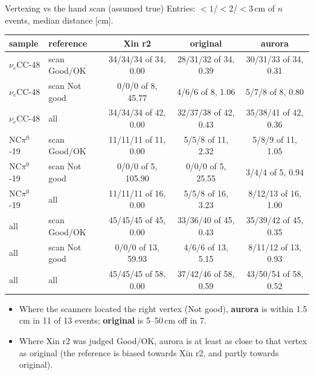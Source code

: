 \documentclass[aspectratio=169,10pt]{beamer}
\begin{document}
\begin{frame}{Vertexing vs the hand scan (assumed true)}
\scriptsize
Entries: $<1$/$<2$/$<3$\,cm of $n$ events, median distance [cm].
\begin{center}
\begin{tabular}{llccc}
\toprule
sample & reference & Xin r2 & original & aurora \\
\midrule
$\nu_e$CC-48 & scan Good/OK & 34/34/34 of 34, 0.00 & 28/31/32 of 34, 0.39 & 30/31/33 of 34, 0.31 \\
$\nu_e$CC-48 & scan Not good & 0/0/0 of 8, 45.77 & 4/6/6 of 8, 1.06 & 5/7/8 of 8, 0.80 \\
$\nu_e$CC-48 & all & 34/34/34 of 42, 0.00 & 32/37/38 of 42, 0.43 & 35/38/41 of 42, 0.36 \\
NC$\pi^0$-19 & scan Good/OK & 11/11/11 of 11, 0.00 & 5/5/8 of 11, 2.32 & 5/8/9 of 11, 1.05 \\
NC$\pi^0$-19 & scan Not good & 0/0/0 of 5, 105.90 & 0/0/0 of 5, 25.55 & 3/4/4 of 5, 0.94 \\
NC$\pi^0$-19 & all & 11/11/11 of 16, 0.00 & 5/5/8 of 16, 3.23 & 8/12/13 of 16, 1.00 \\
all & scan Good/OK & 45/45/45 of 45, 0.00 & 33/36/40 of 45, 0.43 & 35/39/42 of 45, 0.35 \\
all & scan Not good & 0/0/0 of 13, 59.93 & 4/6/6 of 13, 5.15 & 8/11/12 of 13, 0.93 \\
all & all & 45/45/45 of 58, 0.00 & 37/42/46 of 58, 0.59 & 43/50/54 of 58, 0.52 \\
\bottomrule
\end{tabular}
\end{center}
\begin{itemize}
\item Where the scanners located the right vertex (Not good), \textbf{aurora} is within 1.5\,cm in 11 of 13 events; \textbf{original} is 5--50\,cm off in 7.
\item Where Xin r2 was judged Good/OK, aurora is at least as close to that vertex as original (the reference is biased towards Xin r2, and partly towards original).
\end{itemize}
\end{frame}
\end{document}
